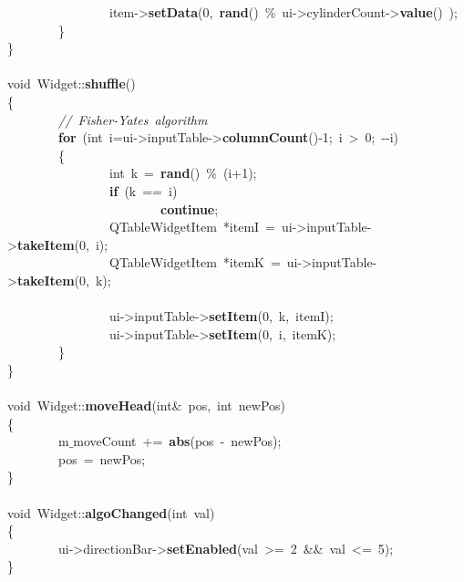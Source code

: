 \mbox{}\ \ \ \ \ \ \ \ \ \ \ \ \ \ \ \ item-\textgreater{}\textbf{setData}(0,\ \textbf{rand}()\ \%\ ui-\textgreater{}cylinderCount-\textgreater{}\textbf{value}()\ ); \\
\mbox{}\ \ \ \ \ \ \ \ \} \\
\mbox{}\} \\
\mbox{} \\
\mbox{}void\ Widget::\textbf{shuffle}() \\
\mbox{}\{ \\
\mbox{}\ \ \ \ \ \ \ \ \textit{//\ Fisher-Yates\ algorithm} \\
\mbox{}\ \ \ \ \ \ \ \ \textbf{for}\ (int\ i=ui-\textgreater{}inputTable-\textgreater{}\textbf{columnCount}()-1;\ i\ \textgreater{}\ 0;\ -\/-i) \\
\mbox{}\ \ \ \ \ \ \ \ \{ \\
\mbox{}\ \ \ \ \ \ \ \ \ \ \ \ \ \ \ \ int\ k\ =\ \textbf{rand}()\ \%\ (i+1); \\
\mbox{}\ \ \ \ \ \ \ \ \ \ \ \ \ \ \ \ \textbf{if}\ (k\ ==\ i) \\
\mbox{}\ \ \ \ \ \ \ \ \ \ \ \ \ \ \ \ \ \ \ \ \ \ \ \ \textbf{continue}; \\
\mbox{}\ \ \ \ \ \ \ \ \ \ \ \ \ \ \ \ QTableWidgetItem\ *itemI\ =\ ui-\textgreater{}inputTable-\textgreater{}\textbf{takeItem}(0,\ i); \\
\mbox{}\ \ \ \ \ \ \ \ \ \ \ \ \ \ \ \ QTableWidgetItem\ *itemK\ =\ ui-\textgreater{}inputTable-\textgreater{}\textbf{takeItem}(0,\ k); \\
\mbox{} \\
\mbox{}\ \ \ \ \ \ \ \ \ \ \ \ \ \ \ \ ui-\textgreater{}inputTable-\textgreater{}\textbf{setItem}(0,\ k,\ itemI); \\
\mbox{}\ \ \ \ \ \ \ \ \ \ \ \ \ \ \ \ ui-\textgreater{}inputTable-\textgreater{}\textbf{setItem}(0,\ i,\ itemK); \\
\mbox{}\ \ \ \ \ \ \ \ \} \\
\mbox{}\} \\
\mbox{} \\
\mbox{}void\ Widget::\textbf{moveHead}(int\&\ pos,\ int\ newPos) \\
\mbox{}\{ \\
\mbox{}\ \ \ \ \ \ \ \ m$\_$moveCount\ +=\ \textbf{abs}(pos\ -\ newPos); \\
\mbox{}\ \ \ \ \ \ \ \ pos\ =\ newPos; \\
\mbox{}\} \\
\mbox{} \\
\mbox{}void\ Widget::\textbf{algoChanged}(int\ val) \\
\mbox{}\{ \\
\mbox{}\ \ \ \ \ \ \ \ ui-\textgreater{}directionBar-\textgreater{}\textbf{setEnabled}(val\ \textgreater{}=\ 2\ \&\&\ val\ \textless{}=\ 5); \\
\mbox{}\} \\
\mbox{}
